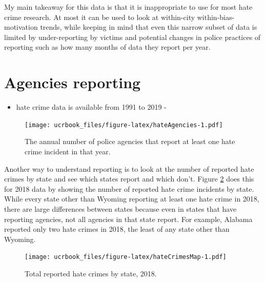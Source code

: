 \documentclass[
  12pt,
  openany]{book}
\providecommand{\tightlist}{%
  \setlength{\itemsep}{0pt}\setlength{\parskip}{0pt}}
\begin{document}
My main takeaway for this data is that it is inappropriate to use for most hate crime research. At most it can be used to look at within-city within-bias-motivation trends, while keeping in mind that even this narrow subset of data is limited by under-reporting by victims and potential changes in police practices of reporting such as how many months of data they report per year.

\hypertarget{agencies-reporting-1}{%
\section{Agencies reporting}\label{agencies-reporting-1}}

\begin{itemize}
\tightlist
\item
  hate crime data is available from 1991 to 2019 -
\end{itemize}

\begin{figure}
\centering
\texttt{[image: ucrbook\_files/figure-latex/hateAgencies-1.pdf]}
\caption{\label{fig:hateAgencies}The annual number of police agencies that report at least one hate crime incident in that year.}
\end{figure}

Another way to understand reporting is to look at the number of reported hate crimes by state and see which states report and which don't. Figure \ref{fig:hateCrimesMap} does this for 2018 data by showing the number of reported hate crime incidents by state. While every state other than Wyoming reporting at least one hate crime in 2018, there are large differences between states because even in states that have reporting agencies, not all agencies in that state report. For example, Alabama reported only two hate crimes in 2018, the least of any state other than Wyoming.

\begin{figure}
\centering
\texttt{[image: ucrbook\_files/figure-latex/hateCrimesMap-1.pdf]}
\caption{\label{fig:hateCrimesMap}Total reported hate crimes by state, 2018.}
\end{figure}
\end{document}

